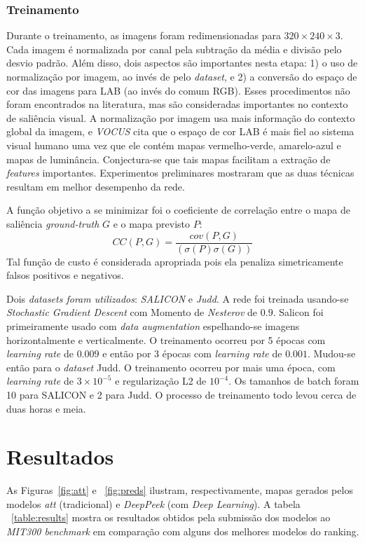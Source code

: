 \documentclass[11pt]{article}
\newcommand{\tit}[1]{\textit{#1}}
\begin{document}
\subsubsection{Treinamento}
Durante o treinamento, as imagens foram redimensionadas para
$320\times240\times3$.
Cada imagem é normalizada por canal pela subtração da média e
divisão pelo desvio padrão.
Além disso, dois aspectos são importantes nesta etapa:
1) o uso de normalização por imagem, ao invés de pelo \tit{dataset}, e 2) a
conversão do espaço de cor das imagens para LAB (ao invés do comum RGB).
Esses procedimentos não foram encontrados na literatura, mas são consideradas
importantes no contexto de saliência visual.
A normalização por imagem usa mais informação do contexto global da imagem, e
\emph{VOCUS} cita que o espaço de cor LAB é mais fiel ao sistema visual humano
uma vez que ele contém mapas vermelho-verde, amarelo-azul e mapas de
luminância.
Conjectura-se que tais mapas facilitam a extração de \tit{features}
importantes.
Experimentos preliminares mostraram que as duas técnicas resultam em melhor
desempenho da rede.

A função objetivo a se minimizar foi
o coeficiente de correlação entre o mapa de saliência \tit{ground-truth} $G$
e o mapa previsto $P$:
$$CC(P, G) = \frac{cov(P, G)}{(\sigma(P)\sigma(G))}$$
Tal função de custo é considerada apropriada pois ela penaliza simetricamente
falsos positivos e negativos.

Dois \tit{datasets foram utilizados}:
\emph{SALICON} e \emph{Judd}.
A rede foi treinada usando-se \tit{Stochastic Gradient Descent}
com Momento de \tit{Nesterov} de $0.9$.
Salicon foi primeiramente usado com \tit{data augmentation} espelhando-se
imagens horizontalmente e verticalmente.
O treinamento ocorreu por 5 épocas com \tit{learning rate} de $0.009$
e então por 3 épocas com \tit{learning rate} de $0.001$.
Mudou-se então para o \tit{dataset} Judd.
O treinamento ocorreu por mais uma época, com \tit{learning rate} de
$3\times10^{-5}$ e regularização L2 de $10^{-4}$.
Os tamanhos de batch foram 10 para SALICON e 2 para Judd.
O processo de treinamento todo levou cerca de duas horas e meia.

\section{Resultados}
As Figuras~\ref{fig:att} e ~\ref{fig:preds} ilustram, respectivamente,
mapas gerados pelos modelos \tit{att} (tradicional) e \tit{DeepPeek}
(com \tit{Deep Learning}).
A tabela ~\ref{table:results} mostra os resultados obtidos pela submissão
dos modelos ao \tit{MIT300 benchmark} em comparação com alguns dos melhores
modelos do ranking.
\end{document}
